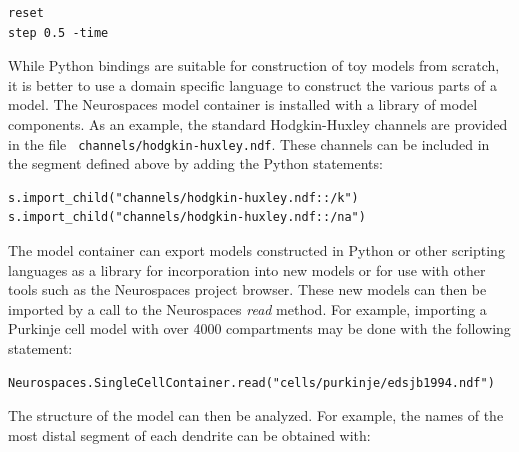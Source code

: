 \documentclass[12pt]{article}
\begin{document}
{\begin{minipage}{1\linewidth}
\begin{minipage}[t]{.50\linewidth}
\begin{verbatim}
reset
step 0.5 -time
\end{verbatim}
    \end{minipage}
  \end{minipage}
  \linenumbers
  \vspace*{1mm}
}

While Python bindings are suitable for construction of toy models from
scratch, it is better to use a domain specific language to construct
the various parts of a model. The Neurospaces model container is
installed with a library of model components.  As an example, the
standard Hodgkin-Huxley channels are provided in the file {\tt
  channels/hodgkin-huxley.ndf}.  These channels can be included in the
segment defined above by adding the Python statements:

{\footnotesize
  \resetlinenumber[23]
  \linenumbers
\begin{verbatim}
s.import_child("channels/hodgkin-huxley.ndf::/k")
s.import_child("channels/hodgkin-huxley.ndf::/na")
\end{verbatim}
}

The model container can export models constructed in Python or other
scripting languages as a library for incorporation into new models or
for use with other tools such as the Neurospaces project browser.
These new models can then be imported by a call to the Neurospaces
{\it read} method. For example, importing a Purkinje cell model with
over 4000 compartments may be done with the following statement:

{\footnotesize
\begin{verbatim}
Neurospaces.SingleCellContainer.read("cells/purkinje/edsjb1994.ndf")
\end{verbatim}
}

The structure of the model can then be analyzed.  For example, the
names of the most distal segment of each dendrite can be obtained
with:
\end{document}
